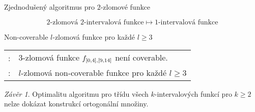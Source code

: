 \documentclass{beamer}
\theoremstyle{remark}
\newtheorem{conclusion}{Závěr}
\begin{document}
\begin{frame}{Zjednodušený algoritmus pro $2$-zlomové funkce}

$$
\text{$2$-zlomová $2$-intervalová funkce}
\mapsto \text{$1$-intervalová funkce}
$$


\begin{example}
\begin{figure}[h]
\centering

\end{figure}
\end{example}

\end{frame}

\begin{frame}{Non-coverable $l$-zlomová funkce pro každé $l \geq 3$}


\begin{tabular}{ll}
\citet{Dubovsky2012}: & $3$-zlomová funkce  $f_{[0, 4], [9, 14]}$ není coverable. \\
\citet{Bartek2015}: & $l$-zlomová non-coverable funkce pro každé $l \geq 3$
\end{tabular}

\begin{conclusion}
Optimalitu algoritmu pro třídu všech $k$-intervalových funkcí pro $k \geq 2$ nelze dokázat konstrukcí ortogonální množiny.
\end{conclusion}

\end{frame}
\end{document}
